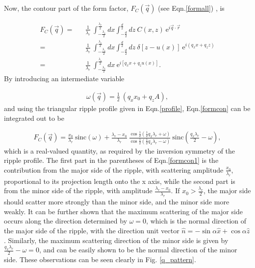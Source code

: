 Now, the contour part of the form factor, $F_C(\vec{q})$ (see Eqn.\ref{formall})
, is

\begin{eqnarray}
\label{formcon}
F_C(\vec{q}) =&& \frac{1}{\lambda_r}\ \int_{- \frac{\lambda_r}{2}}^{ 
\frac{\lambda_r}{2}} dx
\int_{- \frac{d}{2}}^{\frac{d}{2}} dz\ C(x,z)\ \mbox{e}^{i \vec{q} \cdot \vec{r}} \nonumber\\
=&& \frac{1}{\lambda_r}\ \int_{- \frac{\lambda_r}{2}}^{\frac{\lambda_r}{2}} dx
\int_{- \frac{d}{2}}^{\frac{d}{2}} dz\ \delta [z - u(x)] \ \mbox{e}^{i (q_x x + q_z z)} \nonumber\\
=&& \frac{1}{\lambda_r}\ \int_{- \frac{\lambda_r}{2}}^{\frac{\lambda_r}{2}} dx\ \mbox{e}^{i [q_x x + q_z u(x)]}.
\end{eqnarray}
By introducing an intermediate variable

\begin{eqnarray}
\label{w}
\omega (\vec{q}) = \frac{1}{2}\ ( q_x x_0 + q_z A),
\end{eqnarray}
and using the triangular ripple profile given in Eqn.\ref{profile}, 
Eqn.\ref{formcon} can be integrated out to be

\begin{eqnarray}
\label{formcon1}
F_C(\vec{q}) = \frac{x_0}{\lambda_r}\ \mbox{sinc}(\omega)
+ \frac{\lambda_r - x_0}{\lambda_r}\ \frac{\cos \frac{1}{2} (\frac{1}{2}
q_x \lambda_r + \omega)}{\cos \frac{1}{2} (\frac{1}{2} q_x \lambda_r -
\omega)}\ 
\mbox{sinc}(\frac{q_x \lambda_r}{2} - \omega ),
\end{eqnarray}
which is a real-valued quantity, as required by the inversion symmetry
of the ripple profile.
The first part in the parentheses of Eqn.\ref{formcon1} is the contribution from the major side of
the ripple, with scattering amplitude \(\frac{x_0}{\lambda_r}\), proportional
to its projection length onto the x axis, while the second part is from the 
minor side of the ripple, with amplitude \(\frac{\lambda_r - x_0}{\lambda_r}\).
If $x_0 > \frac{\lambda_r}{2}$, the major side should 
scatter more strongly than the minor side, and the minor side more weakly. 
It can be further shown that the maximum scattering 
of the major side occurs
along the direction determined by $\omega = 0$, which is the normal direction
of the major side of the ripple, with the direction unit vector \(\hat{n} =
- \sin \alpha \hat{x} + \cos \alpha \hat{z}\). Similarly, the maximum scattering
direction of the minor side is given by \( \frac{q_x \lambda_r}{2} - \omega 
= 0 \), and can be easily shown to be the normal direction of the minor side.
These observations can be seen clearly in Fig. \ref{q_pattern}.

